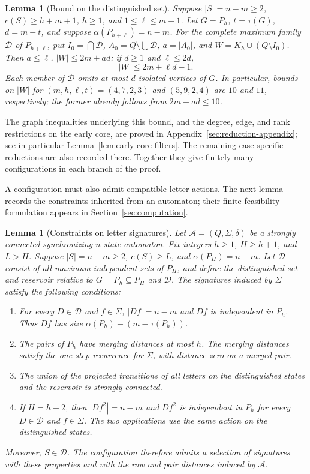 \documentclass[11pt]{article}
\newtheorem{lemma}[theorem]{Lemma}
\theoremstyle{definition}
\theoremstyle{plain}
\begin{document}
\begin{lemma}[Bound on the distinguished set]\label{lem:finite-named-support}
Suppose $|S|=n-m\ge2$, $c(S)\ge h+m+1$, $h\ge1$, and
$1\le\ell\le m-1$. Let $G=P_h$,
$t=\tau(G)$, $d=m-t$, and suppose $\alpha(P_{h+\ell})=n-m$.
For the complete maximum family $\mathcal D$ of $P_{h+\ell}$, put
$I_0=\bigcap\mathcal D$, $A_0=Q\setminus\bigcup\mathcal D$,
$a=|A_0|$, and $W=K_h\cup(Q\setminus I_0)$.
Then $a\le\ell$, $|W|\le2m+ad$; if $d\ge1$ and $\ell\le2d$,
\[
 |W|\le2m+\ell d-1.
\]
Each member of $\mathcal D$ omits at most $d$ isolated vertices of $G$.
In particular, bounds on $|W|$ for $(m,h,\ell,t)=(4,7,2,3)$ and
$(5,9,2,4)$ are $10$ and $11$, respectively; the former already
follows from $2m+ad\le10$.
\end{lemma}

The graph inequalities underlying this bound, and the degree, edge,
and rank restrictions on the early core, are proved in
Appendix~\ref{sec:reduction-appendix}; see in particular
Lemma~\ref{lem:early-core-filters}. The remaining case-specific
reductions are also recorded there. Together they give finitely many
configurations in each branch of the proof.

A configuration must also admit compatible letter actions. The next
lemma records the constraints inherited from an automaton; their
finite feasibility formulation appears in Section~\ref{sec:computation}.

\begin{lemma}[Constraints on letter signatures]\label{lem:finite-signatures}
Let $\mathcal A=(Q,\Sigma,\delta)$ be a strongly connected synchronizing
$n$-state automaton. Fix integers $h\ge1$, $H\ge h+1$, and $L>H$.
Suppose $|S|=n-m\ge2$, $c(S)\ge L$, and
$\alpha(P_H)=n-m$. Let $\mathcal D$ consist of all maximum
independent sets of $P_H$, and define the distinguished set and
reservoir relative to $G=P_h\subseteq P_H$ and $\mathcal D$.
The signatures induced by $\Sigma$ satisfy the following conditions:
\begin{enumerate}
\item For every $D\in\mathcal D$ and $f\in\Sigma$, $|Df|=n-m$
and $Df$ is independent in $P_h$. Thus $Df$ has size
$\alpha(P_h)-(m-\tau(P_h))$.
\item The pairs of $P_h$ have merging distances at most $h$.
The merging distances satisfy the one-step recurrence for $\Sigma$,
with distance zero on a merged pair.
\item The union of the projected transitions of all letters on the
distinguished states and the reservoir is strongly connected.
\item If $H=h+2$, then $|Df^2|=n-m$ and $Df^2$ is independent
in $P_h$ for every $D\in\mathcal D$ and $f\in\Sigma$.
The two applications use the same action on the distinguished states.
\end{enumerate}
Moreover, $S\in\mathcal D$. The configuration therefore admits a
selection of signatures with these properties and with the row and
pair distances induced by $\mathcal A$.
\end{lemma}
\end{document}
